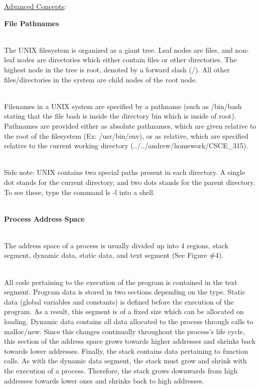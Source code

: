 \documentclass[12pt]{extarticle}
\newenvironment{myindentpar}[1]%
 {\begin{list}{}%
         {\setlength{\leftmargin}{#1}}%
         \item[]%
 }
 {\end{list}}
\begin{document}
\newpage
\noindent
{\large \underline{Advanced Concepts}:} 

\begin{myindentpar}{5mm}

    \vspace{3mm}
    \noindent
    \textbf{File Pathnames}
    
    \ \\
    The UNIX filesystem is organized as a giant tree.  Leaf nodes are files, and non-leaf nodes are directories which either contain files or other directories.  The highest node in the tree is root, denoted by a forward slash (/).  All other files/directories in the system are child nodes of the root node.  
    
    \ \\
    Filenames in a UNIX system are specified by a pathname (such as /bin/bash stating that the file bash is inside the directory bin which is inside of root).  Pathnames are provided either as absolute pathnames, which are given relative to the root of the filesystem (Ex: /usr/bin/env), or as relative, which are specified relative to the current working directory (../../andrew/homework/CSCE\_315).  
    
    \ \\
    Side note: UNIX contains two special paths present in each directory.  A single dot stands for the current directory, and two dots stands for the parent directory.  To see these, type the command ls -l into a shell.  
    
    \ \\
    \textbf{Process Address Space}
    
    \ \\
    The address space of a process is usually divided up into 4 regions, stack segment, dynamic data, static data, and text segment (See Figure \#4).  
    
    \ \\
    All code pertaining to the execution of the program is contained in the text segment.  Program data is stored in two sections depending on the type.  Static data (global variables and constants) is defined before the execution of the program.  As a result, this segment is of a fixed size which can be allocated on loading.  Dynamic data contains all data allocated to the process through calls to malloc/new.  Since this changes continually throughout the process's life cycle, this section of the address space grows towards higher addresses and shrinks back towards lower addresses.  Finally, the stack contains data pertaining to function calls.  As with the dynamic data segment, the stack must grow and shrink with the execution of a process.  Therefore, the stack grows downwards from high addresses towards lower ones and shrinks back to high addresses.  

\end{myindentpar}
\end{document}
